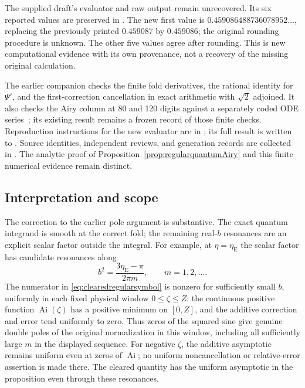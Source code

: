 The supplied draft's evaluator and raw output remain
unrecovered. Its six reported values are preserved in
.
The new first value is
$0.459086488736078952\ldots$, replacing the previously printed
$0.459087$ by $0.459086$; the original rounding procedure is
unknown. The other five values agree after rounding. This is
new computational evidence with its own provenance, not a
recovery of the missing original calculation.

The earlier companion 
checks the finite fold derivatives, the rational identity for
$\Psi'$, and the first-correction cancellation in exact
arithmetic with $\sqrt2$ adjoined. It also checks the Airy
column at 80 and 120 digits against a separately coded ODE
series~\cite[Sections~9.2 and~9.4]{DLMF}; its existing result
remains a frozen record of those finite checks.
Reproduction instructions for the new evaluator are in
; its full
result is written to .
Source identities, independent reviews, and generation records
are collected in
.
The analytic proof of Proposition~\ref{prop:regularquantumAiry}
and this finite numerical evidence remain distinct.

\subsection{Interpretation and scope}

The correction to the earlier pole argument is substantive.
The exact quantum integrand is smooth at the correct fold;
the remaining real-$b$ resonances are an explicit scalar
factor outside the integral. For example, at $\eta=\eta_{\mathrm E}$
the scalar factor has candidate resonances along
\[
 b^2=\frac{3\eta_{\mathrm E}-\pi}{2\pi m},
       \qquad m=1,2,\ldots.
\]
The numerator in \eqref{eq:clearedregularsymbol} is nonzero
for sufficiently small $b$, uniformly in each fixed physical
window $0\le\zeta\le Z$: the continuous positive function
$\operatorname{Ai}(\zeta)$ has a positive minimum on $[0,Z]$,
and the additive correction and error tend uniformly to zero.
Thus zeros of the squared sine give genuine double poles of
the original normalization in this window, including all
sufficiently large $m$ in the displayed sequence. For negative
$\zeta$, the additive asymptotic remains uniform even at
zeros of $\operatorname{Ai}$; no uniform noncancellation or
relative-error assertion is made there.
The cleared quantity has the uniform asymptotic in the
proposition even through these resonances.

